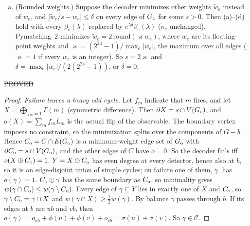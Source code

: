 \begin{theorem}
\begin{enumerate}[(a)]
\item (Rounded weights.) Suppose the decoder minimizes other weights $\tilde w_e$ instead of $w_e$, and $|\tilde w_e/s-w_e|\le\delta$ on every edge of $G_{\rm o}$ for some $s>0$. Then (a)--(d) hold with every $\beta_e(\lambda)$ replaced by $e^{\lambda\delta}\beta_e(\lambda)$ ($\kappa_e$ unchanged).
Pymatching~2 \cite{SB} minimizes $\tilde w_e=2\,\mathrm{round}(\varkappa w_e)$, where $w_e$ are its floating-point weights and $\varkappa=(2^{24}-1)/\max_e|w_e|$, the maximum over all edges ($\varkappa=1$ if every $w_e$ is an integer). So $s=2\varkappa$ and $\delta=\max_e|w_e|/(2(2^{24}-1))$, or $\delta=0$.
\end{enumerate}
\hfill\st{PROVED}
\end{theorem}
\begin{proof}
\emph{Failure leaves a heavy odd cycle.}
Let $f_m$ indicate that $m$ fires, and let $X=\bigoplus_{f_m=1}\Gamma(m)$ (symmetric difference). Then $\partial X=s\cap V(G_{\rm o})$, and $o(X)=\sum_mf_mL_m$ is the actual flip of the observable.
The boundary vertex imposes no constraint, so the minimization splits over the components of $G-b$. Hence $C_{\rm o}=C\cap E(G_{\rm o})$ is a minimum-weight edge set of $G_{\rm o}$ with $\partial C_{\rm o}=s\cap V(G_{\rm o})$, and the other edges of $C$ have $o=0$. So the decoder fails iff $o(X\oplus C_{\rm o})=1$.
$Y=X\oplus C_{\rm o}$ has even degree at every detector, hence also at $b$, so it is an edge-disjoint union of simple cycles; on failure one of them, $\gamma$, has $o(\gamma)=1$.
$C_{\rm o}\oplus\gamma$ has the same boundary as $C_{\rm o}$, so minimality gives $w(\gamma\cap C_{\rm o})\le w(\gamma\setminus C_{\rm o})$. Every edge of $\gamma\subseteq Y$ lies in exactly one of $X$ and $C_{\rm o}$, so $\gamma\setminus C_{\rm o}=\gamma\cap X$ and $w(\gamma\cap X)\ge\tfrac12w(\gamma)$.
By balance $\gamma$ passes through $b$. If its edges at $b$ are $ub$ and $vb$, then $o(\gamma)=o_{ub}+\phi(u)+\phi(v)+o_{vb}=\sigma(u)+\sigma(v)$. So $\gamma\in\mathcal C$.


\end{proof}
